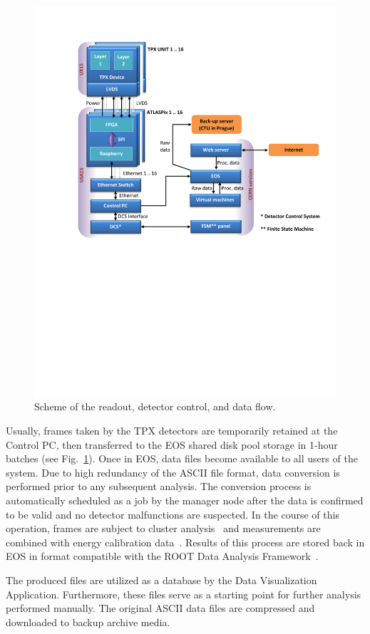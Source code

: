 \begin{figure}[tbp]
  \centering
  \includegraphics[clip, trim={2cm 11.2cm 0cm 2.6cm}, width=.5\textwidth, angle=0]{Plots/Doc1.pdf}
  \caption{Scheme of the readout, detector control, and data flow.}
  \label{fig:data_flow}
\end{figure}

Usually, frames taken by the TPX detectors are temporarily retained at the Control PC, then transferred to the EOS shared disk pool storage in 1-hour batches (see Fig.~\ref{fig:data_flow}). Once in EOS, data files become available to all users of the system. Due to high redundancy of the ASCII file format, data conversion is performed prior to any subsequent analysis. The conversion process is automatically scheduled as a job by the manager node after the data is confirmed to be valid and no detector malfunctions are suspected. In the course of this operation, frames are subject to cluster analysis~\cite{Holy2008} and measurements are combined with energy calibration data~\cite{Jakubek2011}. Results of this process are stored back in EOS in format compatible with the ROOT Data Analysis Framework~\cite{ROOT}.

The produced files are utilized as a database by the Data Visualization Application. Furthermore, these files serve as a starting point for further analysis performed manually. The original ASCII data files are compressed and downloaded to backup archive media.
